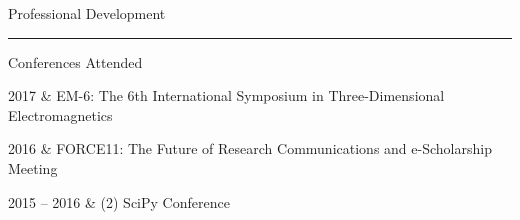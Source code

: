 \documentclass[oneside]{cv}
\newcommand{\heading}[1]{
    \vspace{0.7cm}
    {\HelveticaNeueUltraLight\fontsize{18pt}{0}\selectfont #1}\\
    \vspace{-0.2cm}
    \hrule
    \vspace{0.4cm}
}
\newcommand{\subheading}[1]{
    \vspace{0.4cm}
    {\HelveticaNeueUltraLight\fontsize{14pt}{0}\selectfont #1}\\
    \vspace{-0.1cm}
}
\begin{document}




\heading{Professional Development}


\subheading{Conferences Attended}

\begin{entryright}
    2017         & EM-6: The 6th International Symposium in Three-Dimensional Electromagnetics
\end{entryright}

\begin{entryright}
    2016         & FORCE11: The Future of Research Communications and e-Scholarship Meeting
\end{entryright}

\begin{entryright}
    2015 -- 2016 & (2) SciPy Conference
\end{entryright}
\end{document}
